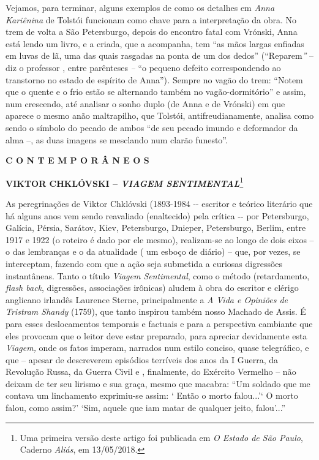 Vejamos, para terminar, alguns exemplos de como os detalhes em
\emph{Anna Kariênina} de Tolstói funcionam como chave para a
interpretação da obra. No trem de volta a São Petersburgo, depois do
encontro fatal com Vrónski, Anna está lendo um livro, e a criada, que a
acompanha, tem ``as mãos largas enfiadas em luvas de lã, uma das quais
rasgadas na ponta de um dos dedos'' (``Reparem\emph{''} -- diz o
professor , entre parênteses \emph{--} ``o pequeno defeito
correspondendo ao transtorno no estado de espírito de Anna'')\emph{.}
Sempre no vagão do trem: ``Notem que o quente e o frio estão se
alternando também no vagão-dormitório'' e assim, num crescendo, até
analisar o sonho duplo (de Anna e de Vrónski) em que aparece o mesmo
anão maltrapilho, que Tolstói, antifreudianamente, analisa como sendo o
símbolo do pecado de ambos ``de seu pecado imundo e deformador da alma
--, as duas imagens se mesclando num clarão funesto''.

\textbf{C O N T E M P O R Â N E O S }

\protect\hypertarget{__DdeLink__16923_1485881000}{}{}\textbf{VIKTOR
CHKLÓVSKI -- \emph{VIAGEM SENTIMENTAL}}\footnote{\protect\hypertarget{__DdeLink__16925_1485881000}{}{}Uma
  primeira versão deste artigo foi publicada em \emph{O Estado de São
  Paulo}, Caderno \emph{Aliás}, em 13/05/2018.}

\protect\hypertarget{__DdeLink__16930_1485881000}{}{\protect\hypertarget{__DdeLink__16921_1485881000}{}{}}As
peregrinações de Viktor Chklóvski (1893-1984 -\/- escritor e teórico
literário que há alguns anos vem sendo reavaliado (enaltecido) pela
crítica -\/- por Petersburgo, Galícia, Pérsia, Sarátov, Kiev,
Petersburgo, Dnieper, Petersburgo, Berlim, entre 1917 e 1922 (o roteiro
é dado por ele mesmo), realizam-se ao longo de dois eixos -- o das
lembranças e o da atualidade ( um esboço de diário) -- que, por vezes,
se interceptam, fazendo com que a ação seja submetida a curiosas
digressões instantâneas. Tanto o título \emph{Viagem Sentimental}, como
o método (retardamento, \emph{flash back}, digressões, associações
irônicas) aludem à obra do escritor e clérigo anglicano irlandês
Laurence Sterne, principalmente a \emph{A Vida e Opiniões de Tristram
Shandy} (1759), que tanto inspirou também nosso Machado de Assis. É para
esses deslocamentos temporais e factuais e para a perspectiva cambiante
que eles provocam que o leitor deve estar preparado, para apreciar
devidamente esta \emph{Viagem,} onde os fatos imperam, narrados num
estilo conciso, quase telegráfico, e que -- apesar de descreverem
episódios terríveis dos anos da I Guerra, da Revolução Russa, da Guerra
Civil e , finalmente, do Exército Vermelho -- não deixam de ter seu
lirismo e sua graça, mesmo que macabra: ``Um soldado que me contava um
linchamento exprimiu-se assim: ` Então o morto falou...'` O morto falou,
como assim?' `Sim, aquele que iam matar de qualquer jeito, falou'...''


